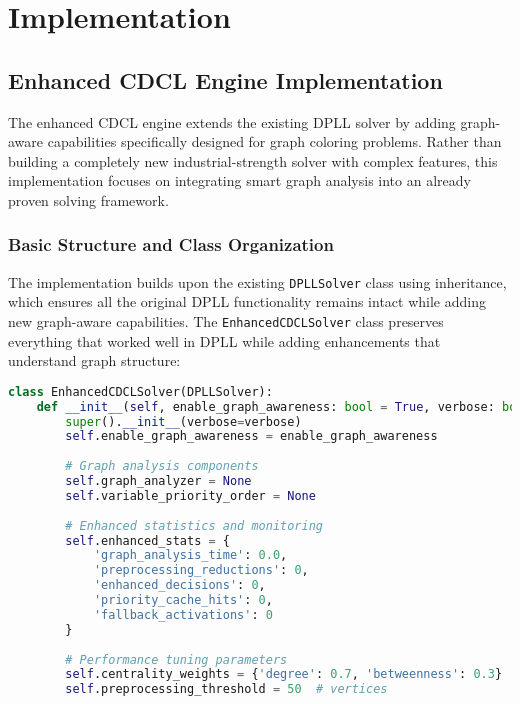 \section{Implementation}

\subsection{Enhanced CDCL Engine Implementation}

The enhanced CDCL engine extends the existing DPLL solver by adding graph-aware capabilities specifically designed for graph coloring problems. Rather than building a completely new industrial-strength solver with complex features, this implementation focuses on integrating smart graph analysis into an already proven solving framework.

\subsubsection{Basic Structure and Class Organization}

The implementation builds upon the existing \texttt{DPLLSolver} class using inheritance, which ensures all the original DPLL functionality remains intact while adding new graph-aware capabilities. The \texttt{Enhanced\-CDCL\-Solver} class preserves everything that worked well in DPLL while adding enhancements that understand graph structure:

\begin{lstlisting}[language=Python, caption=Enhanced CDCL Solver Class Architecture]
class EnhancedCDCLSolver(DPLLSolver):
    def __init__(self, enable_graph_awareness: bool = True, verbose: bool = False):
        super().__init__(verbose=verbose)
        self.enable_graph_awareness = enable_graph_awareness
        
        # Graph analysis components
        self.graph_analyzer = None
        self.variable_priority_order = None
        
        # Enhanced statistics and monitoring
        self.enhanced_stats = {
            'graph_analysis_time': 0.0,
            'preprocessing_reductions': 0,
            'enhanced_decisions': 0,
            'priority_cache_hits': 0,
            'fallback_activations': 0
        }
        
        # Performance tuning parameters
        self.centrality_weights = {'degree': 0.7, 'betweenness': 0.3}
        self.preprocessing_threshold = 50  # vertices
\end{lstlisting}

